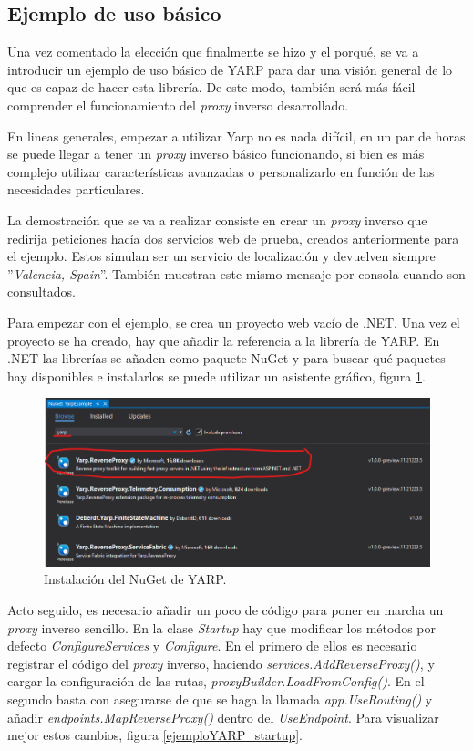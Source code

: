 \documentclass[11pt,spanish,listoffigures]{tfgetsinf}
\begin{document}
		\subsection{Ejemplo de uso básico} \label{ejemploUsoYARP}

Una vez comentado la elección que finalmente se hizo y el porqué, se va a introducir un ejemplo de uso básico de YARP para dar una visión general de lo que es capaz de hacer esta librería. De este modo, también será más fácil comprender el funcionamiento del \emph{proxy} inverso desarrollado.

En lineas generales, empezar a utilizar Yarp no es nada difícil, en un par de horas se puede llegar a tener un \emph{proxy} inverso básico funcionando, si bien es más complejo utilizar características avanzadas o personalizarlo en función de las necesidades particulares.

La demostración que se va a realizar consiste en crear un \emph{proxy} inverso que redirija peticiones hacía dos servicios web de prueba, creados anteriormente para el ejemplo. Estos simulan ser un servicio de localización y devuelven siempre ''\emph{Valencia, Spain}''. También muestran este mismo mensaje por consola cuando son consultados.

Para empezar con el ejemplo, se crea un proyecto web vacío de .NET. Una vez el proyecto se ha creado, hay que añadir la referencia a la librería de YARP. En .NET las librerías se añaden como paquete NuGet \cite{NuGet} y para buscar qué paquetes hay disponibles e instalarlos se puede utilizar un asistente gráfico, figura \ref{ejemploYARP_instalacionNuGet}.

\begin{figure}[ht]
\centering
\includegraphics[width=1\textwidth]{imagenes/ejemploYARP/instalacionNuGet}
\caption{Instalación del NuGet de YARP.}
	\label{ejemploYARP_instalacionNuGet}
\end{figure}

Acto seguido, es necesario añadir un poco de código para poner en marcha un \emph{proxy} inverso sencillo. En la clase \emph{Startup} hay que modificar los métodos por defecto \emph{ConfigureServices} y \emph{Configure}. En el primero de ellos es necesario registrar el código del \emph{proxy} inverso, haciendo \emph{services.AddReverseProxy()}, y cargar la configuración de las rutas, \emph{proxyBuilder.LoadFromConfig()}. En el segundo basta con asegurarse de que se haga la llamada \emph{app.UseRouting()} y añadir  \emph{endpoints.MapReverseProxy()} dentro del \emph{UseEndpoint}. Para visualizar mejor estos cambios, figura \ref{ejemploYARP_startup}.
\end{document}

